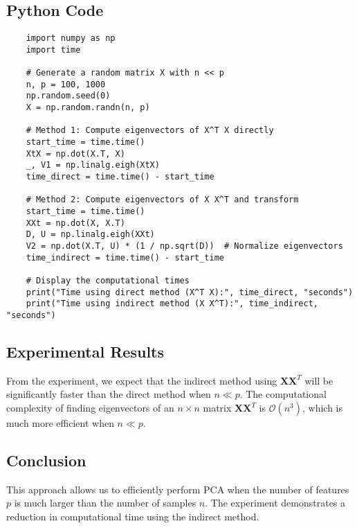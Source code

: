 \documentclass[11pt]{article}
\begin{document}
	
	\subsection*{Python Code}
	
	\begin{verbatim}
	import numpy as np
	import time
	
	# Generate a random matrix X with n << p
	n, p = 100, 1000
	np.random.seed(0)
	X = np.random.randn(n, p)
	
	# Method 1: Compute eigenvectors of X^T X directly
	start_time = time.time()
	XtX = np.dot(X.T, X)
	_, V1 = np.linalg.eigh(XtX)
	time_direct = time.time() - start_time
	
	# Method 2: Compute eigenvectors of X X^T and transform
	start_time = time.time()
	XXt = np.dot(X, X.T)
	D, U = np.linalg.eigh(XXt)
	V2 = np.dot(X.T, U) * (1 / np.sqrt(D))  # Normalize eigenvectors
	time_indirect = time.time() - start_time
	
	# Display the computational times
	print("Time using direct method (X^T X):", time_direct, "seconds")
	print("Time using indirect method (X X^T):", time_indirect, "seconds")
	\end{verbatim}
	
	\subsection*{Experimental Results}
	From the experiment, we expect that the indirect method using $\mathbf{X} \mathbf{X}^T$ will be significantly faster than the direct method when $n \ll p$. The computational complexity of finding eigenvectors of an $n \times n$ matrix $\mathbf{X} \mathbf{X}^T$ is $\mathcal{O}(n^3)$, which is much more efficient when $n \ll p$.
	
	\subsection*{Conclusion}
	This approach allows us to efficiently perform PCA when the number of features $p$ is much larger than the number of samples $n$. The experiment demonstrates a reduction in computational time using the indirect method.	
	
	\newpage

	
\end{document}
